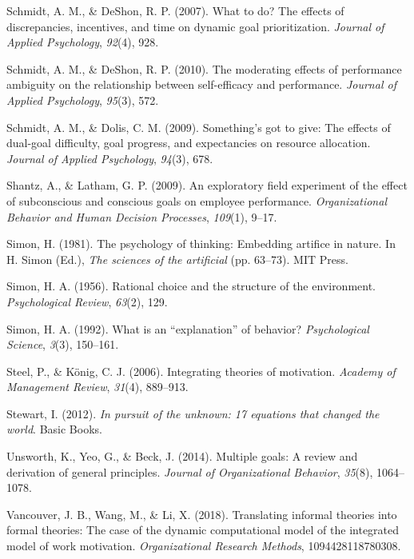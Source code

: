 \documentclass[english,,man]{apa6}
\theoremstyle{definition}
\theoremstyle{definition}
\theoremstyle{definition}
\theoremstyle{remark}
\begin{document}
\leavevmode\hypertarget{ref-schmidt2007}{}%
Schmidt, A. M., \& DeShon, R. P. (2007). What to do? The effects of
discrepancies, incentives, and time on dynamic goal prioritization.
\emph{Journal of Applied Psychology}, \emph{92}(4), 928.

\leavevmode\hypertarget{ref-schmidt2010moderating}{}%
Schmidt, A. M., \& DeShon, R. P. (2010). The moderating effects of
performance ambiguity on the relationship between self-efficacy and
performance. \emph{Journal of Applied Psychology}, \emph{95}(3), 572.

\leavevmode\hypertarget{ref-schmidt2009something}{}%
Schmidt, A. M., \& Dolis, C. M. (2009). Something's got to give: The
effects of dual-goal difficulty, goal progress, and expectancies on
resource allocation. \emph{Journal of Applied Psychology}, \emph{94}(3),
678.

\leavevmode\hypertarget{ref-shantz2009}{}%
Shantz, A., \& Latham, G. P. (2009). An exploratory field experiment of
the effect of subconscious and conscious goals on employee performance.
\emph{Organizational Behavior and Human Decision Processes},
\emph{109}(1), 9--17.

\leavevmode\hypertarget{ref-simonant}{}%
Simon, H. (1981). The psychology of thinking: Embedding artifice in
nature. In H. Simon (Ed.), \emph{The sciences of the artificial} (pp.
63--73). MIT Press.

\leavevmode\hypertarget{ref-simon1956rational}{}%
Simon, H. A. (1956). Rational choice and the structure of the
environment. \emph{Psychological Review}, \emph{63}(2), 129.

\leavevmode\hypertarget{ref-simon1992explanation}{}%
Simon, H. A. (1992). What is an ``explanation'' of behavior?
\emph{Psychological Science}, \emph{3}(3), 150--161.

\leavevmode\hypertarget{ref-steel2006}{}%
Steel, P., \& König, C. J. (2006). Integrating theories of motivation.
\emph{Academy of Management Review}, \emph{31}(4), 889--913.

\leavevmode\hypertarget{ref-stewart2012}{}%
Stewart, I. (2012). \emph{In pursuit of the unknown: 17 equations that
changed the world}. Basic Books.

\leavevmode\hypertarget{ref-unsworth2014multiple}{}%
Unsworth, K., Yeo, G., \& Beck, J. (2014). Multiple goals: A review and
derivation of general principles. \emph{Journal of Organizational
Behavior}, \emph{35}(8), 1064--1078.

\leavevmode\hypertarget{ref-vancouver2018translating}{}%
Vancouver, J. B., Wang, M., \& Li, X. (2018). Translating informal
theories into formal theories: The case of the dynamic computational
model of the integrated model of work motivation. \emph{Organizational
Research Methods}, 1094428118780308.
\end{document}
